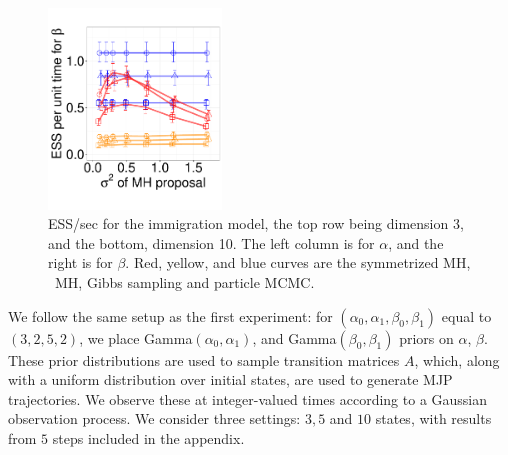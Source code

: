 {\begin{figure}
\begin{minipage}[hp]{0.99\linewidth}
    \includegraphics [width=0.41\textwidth, angle=0]{figs/q_10_beta.pdf}
    \vspace{-0.1 in}
  \end{minipage}
    \caption{ESS/sec for the immigration model, the top row being dimension 3, and the bottom,
      dimension 10. The left column is for $\alpha$, and the 
    right is for $\beta$. Red, yellow, and blue curves are the symmetrized MH,
  \naive\ MH, Gibbs sampling and particle MCMC.}
     \label{fig:ESS_Q_D10}
  \end{figure}
We follow the same setup as the first experiment:
for $(\alpha_0,\alpha_1,\beta_0,\beta_1)$ equal to $(3,2,5,2)$,
we place Gamma$(\alpha_0,\alpha_1)$, and Gamma$(\beta_0, \beta_1)$ priors on 
$\alpha$, $\beta$. These prior distributions are used to sample transition 
matrices $A$, which, along with a uniform distribution over initial states,
are used to generate MJP trajectories. We observe these at integer-valued
times according to a Gaussian observation process.
We consider three settings: $3, 5$ and $10$ states, with results from $5$ 
steps included in the appendix. 

}
